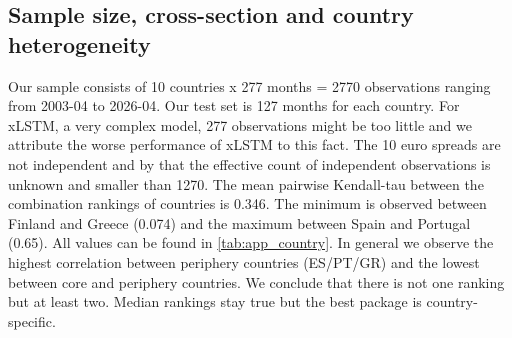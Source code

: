 \subsection{Sample size, cross-section and country heterogeneity}
\label{sec:lim:sample}
Our sample consists of 10 countries x 277 months = 2770 observations ranging from 2003-04 to 2026-04. Our test set is 127 months for each country. For xLSTM, a very complex model, 277 observations might be too little and we attribute the worse performance of xLSTM to this fact.
%
%
The 10 euro spreads are not independent and by that the effective count of independent observations is unknown and smaller than 1270.
%
The mean pairwise Kendall-tau between the combination rankings of countries is 0.346. The minimum is observed between Finland and Greece (0.074) and the maximum between Spain and Portugal (0.65). All values can be found in \cref{tab:app_country}. In general we observe the highest correlation between periphery countries (ES/PT/GR) and the lowest between core and periphery countries. We conclude that there is not one ranking but at least two. Median rankings stay true but the best package is country-specific.
